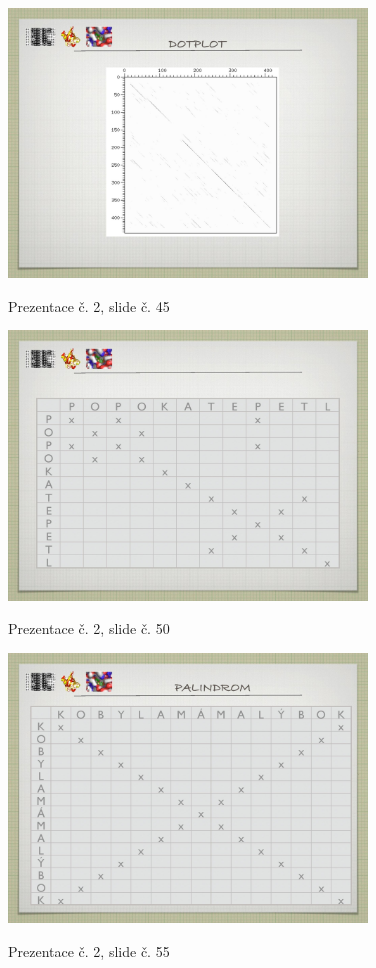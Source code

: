 \documentclass[DIV=8]{scrreprt}
\begin{document}
\begin{figure}
    \caption{Prezentace č. 2, slide č. 45}
    \includegraphics[width=0.85\textwidth]{slides-2/slide-45.jpg}
    \centering
    \label{slides-2-slide-45}
\end{figure}
\begin{figure}
    \caption{Prezentace č. 2, slide č. 50}
    \includegraphics[width=0.85\textwidth]{slides-2/slide-50.jpg}
    \centering
    \label{slides-2-slide-50}
\end{figure}
\begin{figure}
    \caption{Prezentace č. 2, slide č. 55}
    \includegraphics[width=0.85\textwidth]{slides-2/slide-55.jpg}
    \centering
    \label{slides-2-slide-55}
\end{figure}
\end{document}
